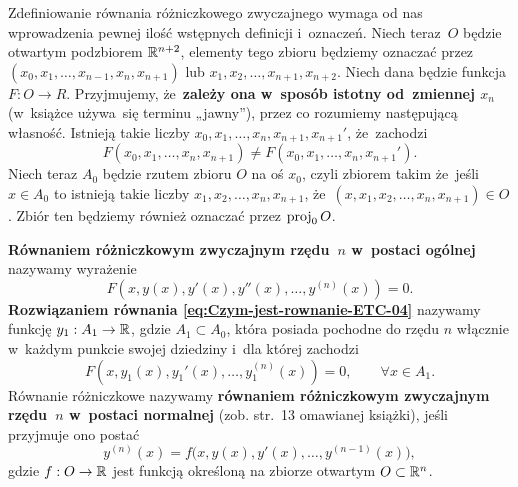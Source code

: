 \documentclass[a4paper,11pt]{article}
\numberwithin{equation}{section}
\begin{document}
Zdefiniowanie równania różniczkowego zwyczajnego wymaga od nas wprowadzenia
pewnej ilość wstępnych definicji i~oznaczeń. Niech teraz~$O$ będzie
otwartym podzbiorem $\mathbb{R}^{ n + 2 }$, elementy tego zbioru będziemy oznaczać
przez $( x_{ 0 }, x_{ 1 }, \ldots, x_{ n - 1 }, x_{ n }, x_{ n + 1 } )$
lub $x_{ 1 }, x_{ 2 }, \ldots, x_{ n + 1 }, x_{ n + 2 }$. Niech dana będzie funkcja
$F : O \to R$. Przyjmujemy, że~\textbf{zależy ona w~sposób istotny
  od~zmiennej $x_{ n }$} (w~książce używa~się terminu „jawny”), przez co
rozumiemy następującą własność. Istnieją takie liczby
$x_{ 0 }, x_{ 1 }, \ldots, x_{ n }, x_{ n + 1 }, x_{ n + 1 }'$, że~zachodzi
\begin{equation}
  \label{eq:Czym-jest-rownanie-ETC-03}
  F( x_{ 0 }, x_{ 1 }, \ldots, x_{ n }, x_{ n + 1 } ) \neq
  F( x_{ 0 }, x_{ 1 }, \ldots, x_{ n }, x_{ n + 1 }' ).
\end{equation}
Niech teraz $A_{ 0 }$ będzie rzutem zbioru $O$ na oś $x_{ 0 }$, czyli zbiorem
takim że~jeśli $x \in A_{ 0 }$ to istnieją takie liczby
$x_{ 1 }, x_{ 2 }, \ldots, x_{ n }, x_{ n + 1 }$,
że~$( x, x_{ 1 }, x_{ 2 }, \ldots, x_{ n }, x_{ n + 1 } ) \in O$. Zbiór ten
będziemy również oznaczać przez $\operatorname{proj}_{ 0 } O$.

\textbf{Równaniem różniczkowym zwyczajnym rzędu~$n$ w~postaci ogólnej}
nazywamy wyrażenie
\begin{equation}
  \label{eq:Czym-jest-rownanie-ETC-04}
  F\left( x, y( x ), y'( x ), y''( x ), \ldots, y^{ ( n ) }( x ) \right) = 0.
\end{equation}
\textbf{Rozwiązaniem równania \eqref{eq:Czym-jest-rownanie-ETC-04}}
nazywamy funkcję $y_{ 1 } : A_{ 1 } \to \mathbb{R}$, gdzie $A_{ 1 } \subset A_{ 0 }$, która
posiada pochodne do rzędu $n$ włącznie w~każdym punkcie swojej dziedziny
i~dla której zachodzi
\begin{equation}
  \label{eq:Czym-jest-rownanie-ETC-05}
  F\left( x, y_{ 1 }( x ), y_{ 1 }'( x ), \ldots, y_{ 1 }^{ ( n ) }( x ) \right) =
  0, \qquad
  \forall x \in A_{ 1 }.
\end{equation}
Równanie różniczkowe nazywamy \textbf{równaniem różniczkowym
  zwyczajnym rzędu~$n$ w~postaci normalnej} (zob. str.~13 omawianej
książki), jeśli przyjmuje ono postać
\begin{equation}
  \label{eq:Czym-jest-rownanie-ETC-06}
  y^{ ( n ) }( x ) = f\big( x, y( x ), y'( x ), \ldots, y^{ ( n - 1 ) }( x ) \big),
\end{equation}
gdzie $f : O \to \mathbb{R}$ jest funkcją określoną na zbiorze otwartym
$O \subset \mathbb{R}^{ n }$.
\end{document}
